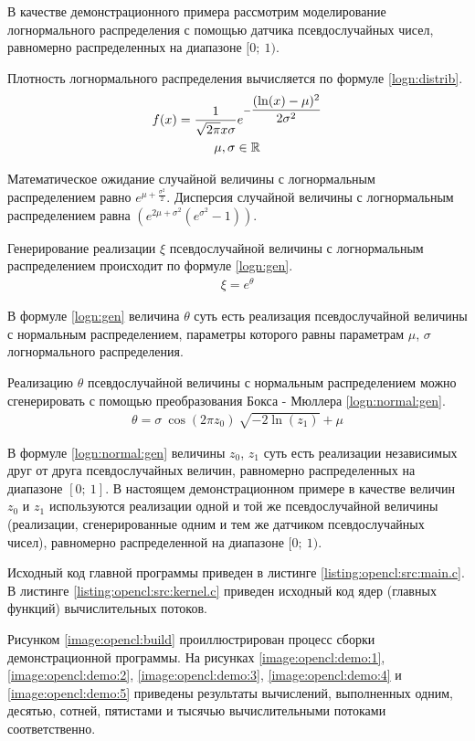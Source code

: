 
В качестве демонстрационного примера рассмотрим моделирование логнормального распределения с помощью датчика псевдослучайных чисел, равномерно распределенных на диапазоне $[0 ;~ 1)$.

Плотность логнормального распределения вычисляется по формуле \eqref{logn:distrib}.
\begin{gather}
	f(x) = \frac{1}{\sqrt{2\pi}x\sigma}e^{-\dfrac{(\ln(x) - \mu)^2}{2\sigma^2}}\label{logn:distrib} \\
	\mu, \sigma \in \mathbb{R} \notag
\end{gather}

Математическое ожидание случайной величины с логнормальным распределением равно $e^{\mu + \frac{\sigma^2}{2}}$. Дисперсия случайной величины с логнормальным распределением равна $(e^{2\mu + \sigma^2}(e^{\sigma^2}- 1))$.

Генерирование реализации $\xi$ псевдослучайной величины с логнормальным распределением происходит по формуле \eqref{logn:gen}.
\begin{gather}
	\xi = e^\theta \label{logn:gen}
\end{gather}

В формуле \eqref{logn:gen} величина $\theta$ суть есть реализация псевдослучайной величины с нормальным распределением, параметры которого равны параметрам $\mu$, $\sigma$ логнормального распределения.

Реализацию $\theta$ псевдослучайной величины с нормальным распределением можно сгенерировать с помощью преобразования Бокса - Мюллера \eqref{logn:normal:gen}.
\begin{gather}
	\theta = \sigma ~ \cos(2 \pi z_0) ~ \sqrt{-2 \ln(z_1)} + \mu \label{logn:normal:gen}
\end{gather}

В формуле \eqref{logn:normal:gen} величины $z_0$, $z_1$ суть есть реализации независимых друг от друга псевдослучайных величин, равномерно распределенных на диапазоне $[0 ;~ 1]$. В настоящем демонстрационном примере в качестве величин $z_0$ и $z_1$ используются реализации одной и той же псевдослучайной величины (реализации, сгенерированные одним и тем же датчиком псевдослучайных чисел), равномерно распределенной на диапазоне $[0 ;~ 1)$.

Исходный код главной программы приведен в листинге \ref{listing:opencl:src:main.c}. В листинге \ref{listing:opencl:src:kernel.c} приведен исходный код ядер (главных функций) вычислительных потоков.

Рисунком \ref{image:opencl:build} проиллюстрирован процесс сборки демонстрационной программы. На рисунках \ref{image:opencl:demo:1}, \ref{image:opencl:demo:2}, \ref{image:opencl:demo:3}, \ref{image:opencl:demo:4} и \ref{image:opencl:demo:5} приведены результаты вычислений, выполненных одним, десятью, сотней, пятистами и тысячью вычислительными потоками соответственно.

